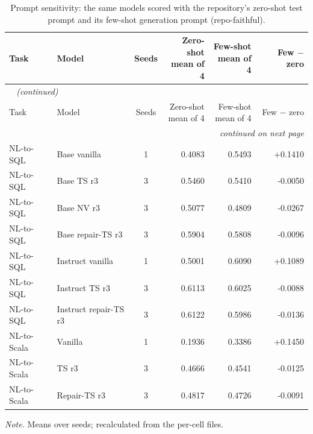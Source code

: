 {\small
{}
\setlength{\tabcolsep}{4.2pt}
\begin{longtable}{@{}llcrrr@{}}
\caption{Prompt sensitivity: the same models scored with the repository's zero-shot test prompt and its few-shot generation prompt (repo-faithful).}\label{tab:gen-prompt}\\
\toprule
\rowcolor{headshade}Task & Model & Seeds & \makecell{Zero-shot\\mean of 4} & \makecell{Few-shot\\mean of 4} & Few $-$ zero\\
\midrule
\endfirsthead
\multicolumn{6}{l}{\textit{\tablename~\thetable{} (continued)}}\\
\toprule
\rowcolor{headshade}Task & Model & Seeds & \makecell{Zero-shot\\mean of 4} & \makecell{Few-shot\\mean of 4} & Few $-$ zero\\
\midrule
\endhead
\midrule
\multicolumn{6}{r}{\textit{continued on next page}}\\
\endfoot
\bottomrule
\endlastfoot
NL-to-SQL & Base vanilla & 1 & 0.4083 & 0.5493 & +0.1410\\
NL-to-SQL & Base TS r3 & 3 & 0.5460 & 0.5410 & -0.0050\\
NL-to-SQL & Base NV r3 & 3 & 0.5077 & 0.4809 & -0.0267\\
NL-to-SQL & Base repair-TS r3 & 3 & 0.5904 & 0.5808 & -0.0096\\
NL-to-SQL & Instruct vanilla & 1 & 0.5001 & 0.6090 & +0.1089\\
NL-to-SQL & Instruct TS r3 & 3 & 0.6113 & 0.6025 & -0.0088\\
NL-to-SQL & Instruct repair-TS r3 & 3 & 0.6122 & 0.5986 & -0.0136\\
NL-to-Scala & Vanilla & 1 & 0.1936 & 0.3386 & +0.1450\\
NL-to-Scala & TS r3 & 3 & 0.4666 & 0.4541 & -0.0125\\
NL-to-Scala & Repair-TS r3 & 3 & 0.4817 & 0.4726 & -0.0091\\
\end{longtable}
}
\vspace{-0.6\baselineskip}
{\footnotesize\color{slate}\textit{Note.} Means over seeds; recalculated from the per-cell files.\par}
\medskip
